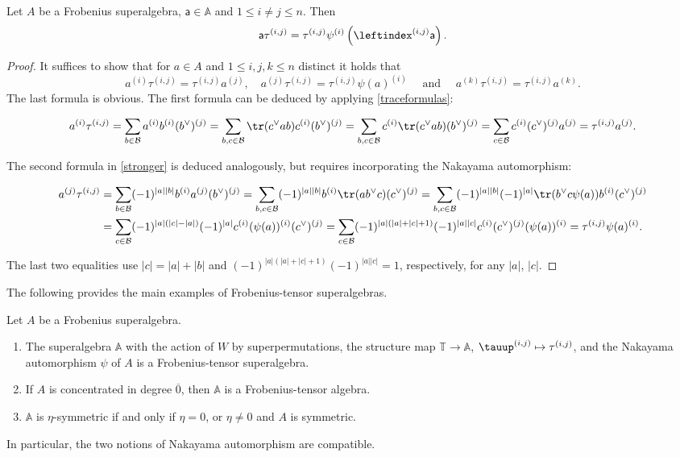 \documentclass[a4paper,11pt]{amsart}
\let\ov\overline
\newcommand\cB{\mathcal{B}}
\numberwithin{equation}{subsection}
\theoremstyle{definition}
\theoremstyle{theorem}
\theoremstyle{remark}
\newcommand\Sym{W}
\newcommand\ba{\mathsf{a}}
\newcommand{\ttau}{\tauup}
\newcommand\Tos{\mathbb{T}}
\newcommand{\Ao}{\mathbb{A}}
\begin{document}
  \begin{Lemma} \label{athroughtau} Let $A$ be a Frobenius superalgebra, $\ba\in \Ao$ and $1\leq i\not=j\leq n$. Then \[\ba\tau^{(i,j)}=\tau^{(i,j)}\psi^{(i)}\left(\leftindex^{(i,j)}\ba\right).\]
  \end{Lemma}
  \begin{proof}
 It suffices to show that for $a\in A$ and $1\leq i,j,k\leq n$ distinct it holds that
   \begin{equation}\label{stronger}
   a^{(i)}\tau^{(i,j)}=\tau^{(i,j)}a^{(j)},\quad
 a^{(j)}\tau^{(i,j)}=\tau^{(i,j)}\psi(a)^{(i)} \quad  \text{ and }\quad a^{(k)}\tau^{(i,j)}=\tau^{(i,j)} a^{(k)}.
 \end{equation}
The last formula is obvious. The first formula can be deduced by applying \autoref{traceformulas}:
\begin{small}
  \begin{equation*}
  a^{(i)}\tau^{(i,j)}=\sum_{b\in\cB}a^{(i)}b^{(i)} (b^\vee)^{(j)}
  =\sum_{b,c\in\cB}\tr(c^\vee ab)c^{(i)}(b^\vee)^{(j)}= \sum_{b,c\in\cB}c^{(i)}\tr(c^\vee ab)(b^\vee)^{(j)}
  = \sum_{c\in\cB}c^{(i)}(c^\vee)^{(j)}a^{(j)}=\tau^{(i,j)}a^{(j)}.
  \end{equation*}
\end{small}
The second formula in \autoref{stronger} is deduced analogously, but requires incorporating the Nakayama automorphism:
\begin{small}
\begin{align*}
a^{(j)}\tau^{(i,j)}
&=\sum_{b\in\cB}(-1)^{|a||b|}b^{(i)}a^{(j)} (b^\vee)^{(j)}
=\sum_{b,c\in\cB}(-1)^{|a||b|}b^{(i)} \tr(ab^\vee c)(c^\vee)^{(j)}=\sum_{b,c\in\cB}(-1)^{|a||b|}(-1)^{|a|}\tr(b^\vee c\psi(a))b^{(i)} (c^\vee)^{(j)}\\
&=\sum_{c\in\cB}(-1)^{|a|(|c|-|a|)}(-1)^{|a|} c^{(i)}(\psi(a))^{(i)} (c^\vee)^{(j)}
=\sum_{c\in\cB}(-1)^{|a|(|a|+|c|+1)}(-1)^{|a||c|} c^{(i)} (c^\vee)^{(j)}(\psi(a))^{(i)}
=\tau^{(i,j)}\psi(a)^{(i)}.
\end{align*}
\end{small}
The last two equalities use $|c|=|a|+|b|$ and
$(-1)^{|a|(|a|+|c|+1)}(-1)^{|a||c|}=1$, respectively, for any $|a|$, $|c|$.
\end{proof}
The following provides the main examples of Frobenius-tensor superalgebras.
\begin{Theorem}\label{T:FrobTensor}Let $A$ be a Frobenius superalgebra.
  \begin{enumerate}
 \item\label{FrobTensora} The superalgebra $\Ao$ with the action of $\Sym$ by superpermutations, the structure
   map $\Tos\rightarrow\Ao$, $\ttau^{(i,j)}\mapsto\tau^{(i,j)}$, and the Nakayama automorphism
   $\psi$ of $A$ is a Frobenius-tensor superalgebra.
 \item\label{FrobTensorb} If $A$ is concentrated in degree $\ov{0}$, then $\Ao$ is a
   Frobenius-tensor algebra.
 \item\label{FrobTensorc} $\Ao$ is $\eta$-symmetric if and only if $\eta=0$, or $\eta\ne0$ and
   $A$ is symmetric.
   \end{enumerate}
    In particular, the two notions of Nakayama automorphism are compatible.
 \end{Theorem}
\end{document}
